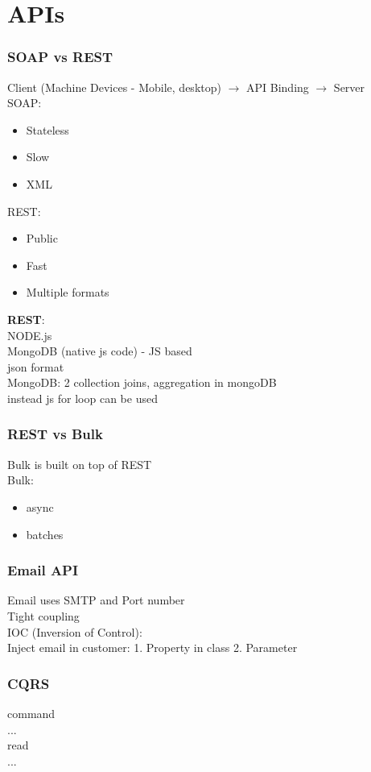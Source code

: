 \documentclass{beamer}
\begin{document}
\section{APIs}
\begin{frame}\frametitle{SOAP vs REST}
	Client (Machine Devices - Mobile, desktop) $\rightarrow$ API Binding $\rightarrow$ Server\\

	SOAP:\\
	\begin{itemize}
		\item Stateless
		\item Slow
		\item XML
	\end{itemize}
	REST:\\
	\begin{itemize}
		\item Public
		\item Fast
		\item Multiple formats
	\end{itemize}
\textbf{REST}:\\
NODE.js\\
MongoDB (native js code) - JS based\\
json format\\
MongoDB: 2 collection joins, aggregation in mongoDB\\instead js for loop can be used\\


\end{frame}

\begin{frame}\frametitle{REST vs Bulk}
	Bulk is built on top of REST\\
	Bulk:\\
	\begin{itemize}
		\item async
		\item batches
	\end{itemize}	
\end{frame}

\begin{frame}\frametitle{Email API}
	Email uses SMTP and Port number\\
	Tight coupling\\
	IOC (Inversion of Control):\\
	Inject email in customer:
	1. Property in class
	2. Parameter
\end{frame}

\begin{frame}\frametitle{CQRS}
	command\\
	...\\
	read\\
	...
\end{frame}
\end{document}
